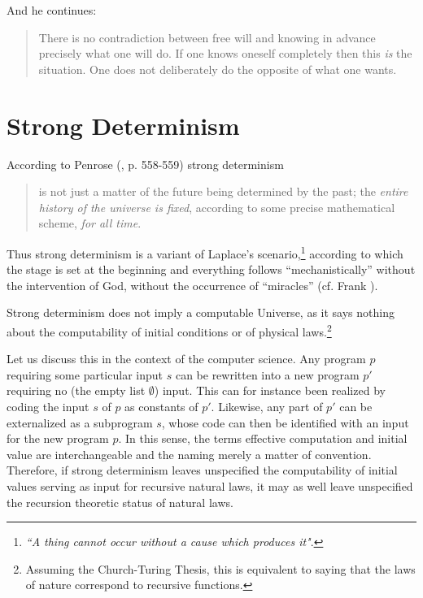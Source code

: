 And he continues:

\begin{quote}
There is no contradiction between free will and knowing in advance
precisely what
one will do. If one knows oneself
completely then this {\it is} the situation. One does not deliberately do the
opposite of what one wants.
\end{quote}





\section{Strong Determinism}

According to Penrose (\cite{penrose}, p. 558-559)  strong determinism
\begin{quote}
is not just a matter of the future being
determined by the past; the {\it entire history of the universe
is fixed}, according to some precise mathematical scheme, {\it for all
time}.
\end{quote}





Thus strong determinism  is a variant of
Laplace's scenario,\footnote{{\em  ``A thing cannot occur without a cause
which produces it"}.}   according to which the stage is set at the
beginning and everything follows ``mechanistically'' without the
intervention of God, without the occurrence of ``miracles''
 (cf.
Frank
\cite{frank}).

Strong determinism
does not imply a computable Universe,
 as it says nothing about the computability of
initial conditions  or of physical laws.\footnote{Assuming
the Church-Turing Thesis, this is
equivalent to saying  that the laws of nature correspond to recursive
functions.}


 Let us discuss this in the context of the
computer science. Any program $p$ requiring some particular input $s$
can be rewritten into a new program $p'$ requiring no (the empty list
$\emptyset $) input. This can for instance been realized by coding the
input $s$ of $p$ as constants of $p'$.
Likewise, any part of $p'$ can be externalized as a subprogram $s$,
whose code can then be identified with an input for the new program $p$.
In this sense, the terms effective computation and initial value are
interchangeable and the naming merely a matter of convention.
Therefore, if strong determinism leaves unspecified the computability of
initial values serving as input for recursive natural laws, it may as
well leave unspecified the recursion theoretic status of  natural
laws.

